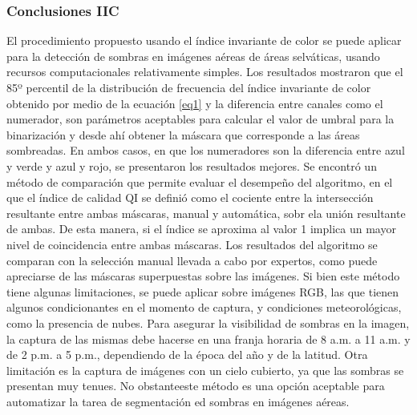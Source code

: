 \subsubsection{Conclusiones IIC} \label{Conclusiones}

El procedimiento propuesto usando el índice invariante de color se puede aplicar para la detección de sombras en imágenes aéreas de áreas selváticas, usando recursos computacionales relativamente simples. Los resultados mostraron que el 85º percentil de la distribución de frecuencia del índice invariante de color obtenido por medio de la ecuación \ref{eq1} y la diferencia entre canales como el numerador, son parámetros aceptables para calcular el valor de umbral para la binarización y desde ahí obtener la máscara que corresponde a las áreas sombreadas.
En ambos casos, en que los numeradores son la diferencia entre azul y verde y azul y rojo, se presentaron los resultados mejores. Se encontró un método de comparación que permite evaluar el desempeño del algoritmo, en el que el índice de calidad QI se definió como el cociente entre la intersección resultante entre ambas máscaras, manual y automática, sobr ela unión resultante de ambas. De esta manera, si el índice se aproxima al valor 1 implica un mayor nivel de coincidencia entre ambas máscaras. Los resultados del algoritmo se comparan con la selección manual llevada a cabo por expertos, como puede apreciarse de las máscaras superpuestas sobre las imágenes. Si bien este método tiene algunas limitaciones, se puede aplicar sobre imágenes RGB, las que tienen algunos condicionantes en el momento de captura, y condiciones meteorológicas, como la presencia de nubes. Para asegurar la visibilidad de sombras en la imagen, la captura de las mismas debe hacerse en una franja horaria de 8 a.m. a 11 a.m. y de 2 p.m. a 5 p.m., dependiendo de la época del año y de la latitud. Otra limitación es la captura de imágenes con un cielo cubierto, ya que las sombras se presentan muy tenues. No obstanteeste método es una opción aceptable para automatizar la tarea de segmentación ed sombras en imágenes aéreas.

